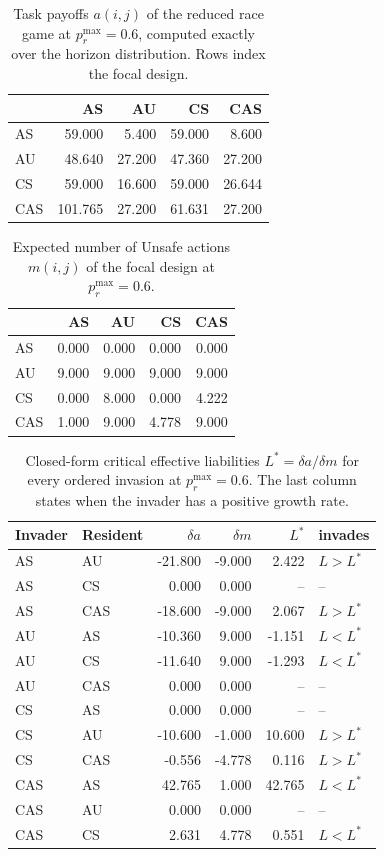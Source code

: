 \begin{table}[htbp]
\centering
\caption{Task payoffs $a(i,j)$ of the reduced race game at $p_r^{\max}=0.6$, computed exactly over the horizon distribution. Rows index the focal design.}
\label{tab:payoff}
\begin{tabular}{lrrrr}
\toprule
 & AS & AU & CS & CAS \\
\midrule
AS & 59.000 & 5.400 & 59.000 & 8.600 \\
AU & 48.640 & 27.200 & 47.360 & 27.200 \\
CS & 59.000 & 16.600 & 59.000 & 26.644 \\
CAS & 101.765 & 27.200 & 61.631 & 27.200 \\
\bottomrule
\end{tabular}
\end{table}

\begin{table}[htbp]
\centering
\caption{Expected number of Unsafe actions $m(i,j)$ of the focal design at $p_r^{\max}=0.6$.}
\label{tab:unsafe-count}
\begin{tabular}{lrrrr}
\toprule
 & AS & AU & CS & CAS \\
\midrule
AS & 0.000 & 0.000 & 0.000 & 0.000 \\
AU & 9.000 & 9.000 & 9.000 & 9.000 \\
CS & 0.000 & 8.000 & 0.000 & 4.222 \\
CAS & 1.000 & 9.000 & 4.778 & 9.000 \\
\bottomrule
\end{tabular}
\end{table}

\begin{table}[htbp]
\centering
\caption{Closed-form critical effective liabilities $L^{*}=\delta a/\delta m$ for every ordered invasion at $p_r^{\max}=0.6$. The last column states when the invader has a positive growth rate.}
\label{tab:thresholds}
\begin{tabular}{llrrrl}
\toprule
Invader & Resident & $\delta a$ & $\delta m$ & $L^{*}$ & invades \\
\midrule
AS & AU & -21.800 & -9.000 & 2.422 & $L>L^*$ \\
AS & CS & 0.000 & 0.000 & -- & -- \\
AS & CAS & -18.600 & -9.000 & 2.067 & $L>L^*$ \\
AU & AS & -10.360 & 9.000 & -1.151 & $L<L^*$ \\
AU & CS & -11.640 & 9.000 & -1.293 & $L<L^*$ \\
AU & CAS & 0.000 & 0.000 & -- & -- \\
CS & AS & 0.000 & 0.000 & -- & -- \\
CS & AU & -10.600 & -1.000 & 10.600 & $L>L^*$ \\
CS & CAS & -0.556 & -4.778 & 0.116 & $L>L^*$ \\
CAS & AS & 42.765 & 1.000 & 42.765 & $L<L^*$ \\
CAS & AU & 0.000 & 0.000 & -- & -- \\
CAS & CS & 2.631 & 4.778 & 0.551 & $L<L^*$ \\
\bottomrule
\end{tabular}
\end{table}
